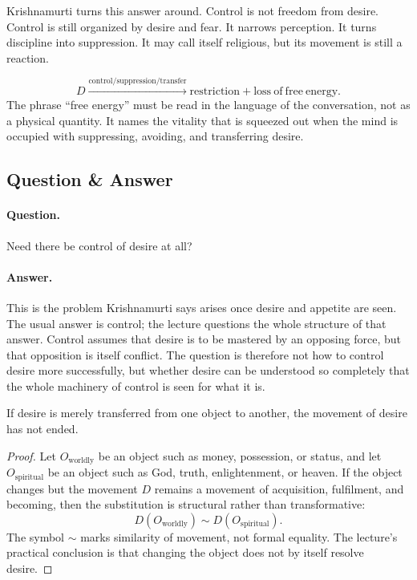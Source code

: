 Krishnamurti turns this answer around. Control is not freedom from desire. Control is still organized by desire and fear. It narrows perception. It turns discipline into suppression. It may call itself religious, but its movement is still a reaction.

\begin{equation}
D
\xrightarrow{\mathrm{control/suppression/transfer}}
\mathrm{restriction}
+
\mathrm{loss\ of\ free\ energy}.
\end{equation}
The phrase ``free energy'' must be read in the language of the conversation, not as a physical quantity. It names the vitality that is squeezed out when the mind is occupied with suppressing, avoiding, and transferring desire.

\subsection{Question \& Answer}

\paragraph{Question.}
Need there be control of desire at all?

\paragraph{Answer.}
This is the problem Krishnamurti says arises once desire and appetite are seen. The usual answer is control; the lecture questions the whole structure of that answer. Control assumes that desire is to be mastered by an opposing force, but that opposition is itself conflict. The question is therefore not how to control desire more successfully, but whether desire can be understood so completely that the whole machinery of control is seen for what it is.

\begin{proposition}
If desire is merely transferred from one object to another, the movement of desire has not ended.
\end{proposition}

\begin{proof}
Let \(O_{\mathrm{worldly}}\) be an object such as money, possession, or status, and let \(O_{\mathrm{spiritual}}\) be an object such as God, truth, enlightenment, or heaven. If the object changes but the movement \(D\) remains a movement of acquisition, fulfilment, and becoming, then the substitution is structural rather than transformative:
\begin{equation}
D(O_{\mathrm{worldly}})
\sim
D(O_{\mathrm{spiritual}}).
\end{equation}
The symbol \(\sim\) marks similarity of movement, not formal equality. The lecture's practical conclusion is that changing the object does not by itself resolve desire.
\end{proof}

